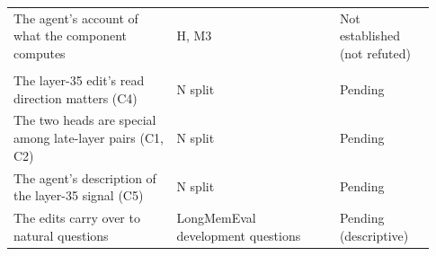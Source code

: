 \begin{longtable}{@{}L{0.36\linewidth}L{0.36\linewidth}L{0.21\linewidth}@{}}
The agent's account of what the component computes & H, M3 & Not established (not refuted) \\
\addlinespace
{} \\*
The layer-35 edit's read direction matters (C4) & N split & Pending \\
The two heads are special among late-layer pairs (C1, C2) & N split & Pending \\
The agent's description of the layer-35 signal (C5) & N split & Pending \\
The edits carry over to natural questions & LongMemEval development questions & Pending (descriptive) \\
\end{longtable}
\endgroup
